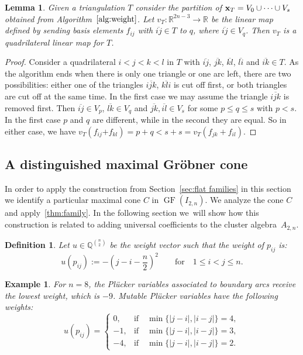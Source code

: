 \documentclass[10pt,a4paper]{amsart}
\newcommand{\thlabel}[1]{\label{#1}}
\newcommand{\thref}[1]{\ref{#1}}
\newtheorem{Lemma}[Theorem]{Lemma}
\newtheorem{Definition}[Theorem]{Definition}
\newtheorem{Example}[Theorem]{Example}
\numberwithin{equation}{section}
\DeclareMathOperator{\GF}{GF}
\begin{document}
\begin{Lemma}\thlabel{lem:ex quad}
Given a triangulation $T$ consider the partition of ${\bf x}_T=V_0\cup\dots\cup V_s$ obtained from Algorithm~$\ref{alg:weight}$.
Let $v_{T}\colon \mathbb R^{2n-3}\to \mathbb R$ be the linear map defined by sending basis elements ${f}_{{ij}}$ with $\overline{ij}\in T$ to $q$, where $\overline{ij}\in V_q$.
Then $v_T$ is a quadrilateral linear map for $T$.
\end{Lemma}
\begin{proof}
Consider a quadrilateral $i<j<k<l$ in $T$ with $\overline{ij}$, $\overline{jk}$, $\overline{kl}$, $\overline{li}$ and $\overline{ik}\in T$.
As the algorithm ends when there is only one triangle or one arc left, there are two possibilities: either one of the triangles $\overline{ijk}$, $\overline{kli}$ is cut off first, or both triangles are cut off at the same time.
In the first case we may assume the triangle $\overline{ijk}$ is removed first.
Then $\overline{ij}\in V_p$, $\overline{lk}\in V_q$ and $\overline{jk}, \overline{il}\in V_s$ for some $p\le q\le s$ with $p<s$.
In the first case $p$ and $q$ are different, while in the second they are equal.
So in either case,
we have $v_T({f}_{ij}{+f}_{kl})=p+q<s+s=v_T({f}_{jk}+{f}_{il})$.
\end{proof}


\subsection{A distinguished maximal Gr\"obner cone}
\label{sec:monomial_degeneration}
In order to apply the construction from Section~\ref{sec:flat families} in this section we identify a particular maximal cone $C$ in $\GF(I_{2,n})$.
We analyze the cone $C$ and apply~\thref{thm:family}.
In the following section we~will show how this construction is related to adding universal coefficients to the cluster algebra~$A_{2,n}$.

\begin{Definition}\thlabel{def:mono wt}
Let $u\in \mathbb Q^{\binom{n}{2}}$ be the weight vector such that the weight of $p_{ij}$ is:
 \begin{displaymath}
 u(p_{ij}):= -\left(j-i-\frac{n}{2}\right)^2\qquad \text{for}\quad 1\le i<j\le n.
 \end{displaymath}
\end{Definition}

\begin{Example}\thlabel{exp:mono wt}
For $n=8$, the Pl\"ucker variables associated to boundary arcs receive the lowest weight, which is $-9$. Mutable Pl\"ucker variables have the following weights:
\begin{displaymath}
u(p_{ij})=\begin{cases}
0, &\text{if}\quad \min\{\vert j-i\vert, \vert i-j\vert\}=4,\\
-1, &\text{if}\quad \min\{\vert j-i\vert, \vert i-j\vert\}=3, \\
-4, &\text{if}\quad \min\{\vert j-i\vert, \vert i-j\vert\}=2.
\end{cases}
\end{displaymath}

\end{Example}
\end{document}
